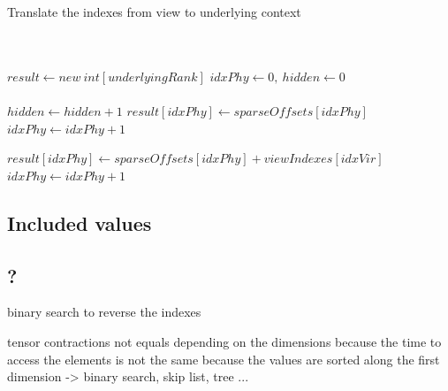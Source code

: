 	
\begin{algorithm}
	\caption{Translate the indexes from view to underlying context}
	\label{alg:translation}
	\begin{algorithmic}
		
		\\
		\\
		\State $result \gets new\ int[underlyingRank]$
		\State $idxPhy \gets 0,\ hidden \gets 0 $
		\\
		\\
		
				\State $hidden \gets hidden + 1$
			\Else
					\State $result[idxPhy] \gets sparseOffsets[idxPhy]$ 
					\State $idxPhy \gets idxPhy + 1$
				\EndWhile\\
				
					\State $result[idxPhy] \gets sparseOffsets[idxPhy] + viewIndexes[idxVir]$ 
					\State $idxPhy \gets idxPhy + 1$
				\EndIf
		
			\EndIf
			
		\EndFor		
		\EndProcedure
		\end{algorithmic}
	\end{algorithm}
	
\subsection{Included values}



\subsection{?}
binary search to reverse the indexes 

tensor contractions not equals depending on the dimensions because the time to access the elements is not the same because the values are sorted along the first dimension
-> binary search, skip list, tree ...

